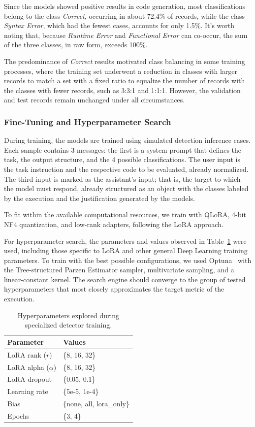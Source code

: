 Since the models showed positive results in code generation, most classifications belong to the class \emph{Correct}, occurring in about 72.4\% of records, while the class \emph{Syntax Error}, which had the fewest cases, accounts for only 1.5\%. It's worth noting that, because \emph{Runtime Error} and \emph{Functional Error} can co-occur, the sum of the three classes, in raw form, exceeds 100\%.

The predominance of \emph{Correct} results motivated class balancing in some training processes, where the training set underwent a reduction in classes with larger records to match a set with a fixed ratio to equalize the number of records with the classes with fewer records, such as 3:3:1 and 1:1:1. However, the validation and test records remain unchanged under all circumstances.

\subsubsection{Fine-Tuning and Hyperparameter Search}

During training, the models are trained using simulated detection inference cases. Each sample contains 3 messages: the first is a system prompt that defines the task, the output structure, and the 4 possible classifications. The user input is the task instruction and the respective code to be evaluated, already normalized. The third input is marked as the assistant's input; that is, the target to which the model must respond, already structured as an object with the classes labeled by the execution and the justification generated by the models.

To fit within the available computational resources, we train with QLoRA, 4-bit NF4 quantization, and low-rank adapters, following the LoRA approach.

For hyperparameter search, the parameters and values observed in Table~\ref{tab:training_params} were used, including those specific to LoRA and other general Deep Learning training parameters. To train with the best possible configurations, we used Optuna~\citep{akiba2019optuna} with the Tree-structured Parzen Estimator sampler, multivariate sampling, and a linear-constant kernel. The search engine should converge to the group of tested hyperparameters that most closely approximates the target metric of the execution.

\begin{table}[htbp]
\centering
\caption{Hyperparameters explored during specialized detector training.}
\label{tab:training_params}
\begin{tabular}{ll}
\toprule
\textbf{Parameter} & \textbf{Values} \\
\midrule
LoRA rank ($r$) & \{8, 16, 32\} \\
LoRA alpha ($\alpha$) & \{8, 16, 32\} \\
LoRA dropout & \{0.05, 0.1\} \\
Learning rate & \{5e-5, 1e-4\} \\
Bias & \{none, all, lora\_only\} \\
Epochs & \{3, 4\} \\
\bottomrule
\end{tabular}
\end{table}

